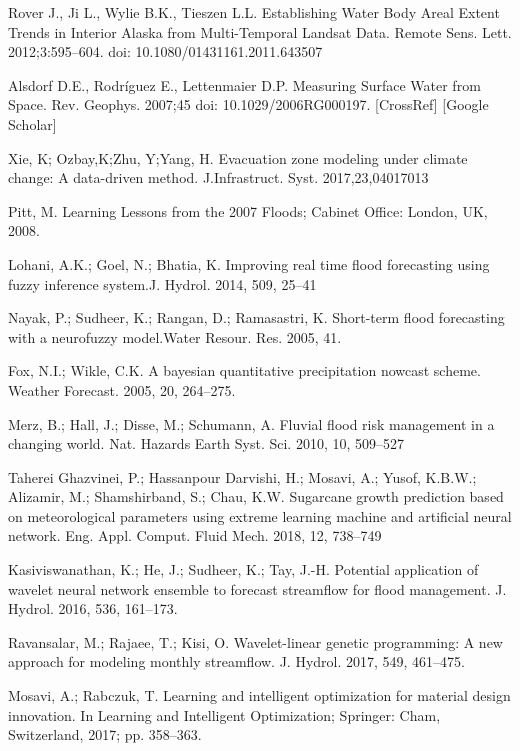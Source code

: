\documentclass[12pt, a4paper]{report}
\begin{document}
\begin{thebibliography}{widest entry}
 Rover J., Ji L., Wylie B.K., Tieszen L.L. Establishing Water Body Areal Extent Trends in Interior Alaska from Multi-Temporal Landsat Data. Remote Sens. Lett. 2012;3:595–604. doi: 10.1080/01431161.2011.643507

 Alsdorf D.E., Rodríguez E., Lettenmaier D.P. Measuring Surface Water from Space. Rev. Geophys. 2007;45 doi: 10.1029/2006RG000197. [CrossRef] [Google Scholar]

 Xie, K; Ozbay,K;Zhu, Y;Yang, H. Evacuation zone modeling under climate change: A data-driven method. J.Infrastruct. Syst. 2017,23,04017013

Pitt, M.	Learning Lessons from the 2007 Floods; Cabinet Office: London, UK, 2008.

Lohani, A.K.; Goel, N.; Bhatia, K. Improving real time flood forecasting using fuzzy inference system.J. Hydrol. 2014, 509, 25–41

Nayak, P.; Sudheer, K.; Rangan, D.; Ramasastri, K. Short-term flood forecasting with a neurofuzzy model.Water Resour. Res. 2005, 41.

Fox, N.I.; Wikle, C.K. A bayesian quantitative precipitation nowcast scheme. Weather Forecast. 2005, 20, 264–275.

Merz, B.; Hall, J.; Disse, M.; Schumann, A. Fluvial flood risk management in a changing world. Nat. Hazards Earth Syst. Sci. 2010, 10, 509–527

Taherei Ghazvinei, P.; Hassanpour Darvishi, H.; Mosavi, A.; Yusof, K.B.W.; Alizamir, M.; Shamshirband, S.; Chau, K.W. Sugarcane growth prediction based on meteorological parameters using extreme learning machine and artificial neural network. Eng. Appl. Comput. Fluid Mech. 2018, 12, 738–749

Kasiviswanathan, K.; He, J.; Sudheer, K.; Tay, J.-H. Potential application of wavelet neural network ensemble to forecast streamflow for flood management. J. Hydrol. 2016, 536, 161–173.

Ravansalar, M.; Rajaee, T.; Kisi, O. Wavelet-linear genetic programming: A new approach for modeling monthly streamflow. J. Hydrol. 2017, 549, 461–475.

Mosavi, A.; Rabczuk, T. Learning and intelligent optimization for material design innovation. In Learning and Intelligent Optimization; Springer: Cham, Switzerland, 2017; pp. 358–363.


\end{thebibliography}
\end{document}
